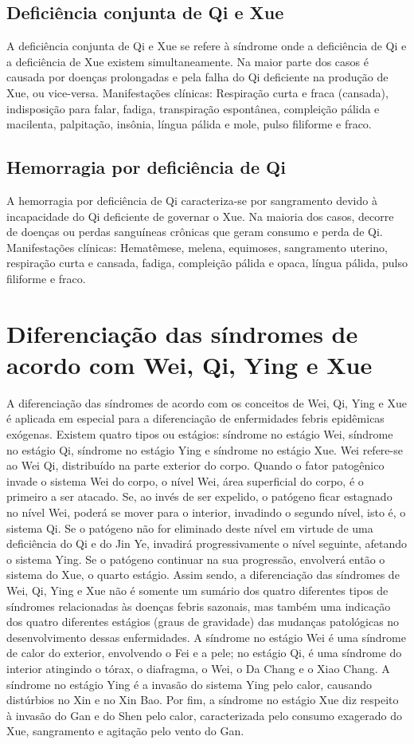 \documentclass[12pt,oneside,a4paper]{book} %
\begin{document}
\section{Deficiência conjunta de Qi e Xue}
A deficiência conjunta de Qi e Xue se refere à síndrome onde a deficiência de Qi e a deficiência de Xue existem simultaneamente. Na maior parte dos casos é causada por doenças prolongadas e pela falha do Qi deficiente na produção de Xue, ou vice-versa.
Manifestações clínicas: Respiração curta e fraca (cansada), indisposição para falar, fadiga, transpiração espontânea, compleição pálida e macilenta, palpitação, insônia, língua pálida e mole, pulso filiforme e fraco.

\section{Hemorragia por deficiência de Qi}
A hemorragia por deficiência de Qi caracteriza-se por sangramento devido à incapacidade do Qi deficiente de governar o Xue. Na maioria dos casos, decorre de doenças ou perdas sanguíneas crônicas que geram consumo e perda de Qi.
Manifestações clínicas: Hematêmese, melena, equimoses, sangramento uterino, respiração curta e cansada, fadiga, compleição pálida e opaca, língua pálida, pulso filiforme e fraco.

\chapter{Diferenciação das síndromes de acordo com Wei, Qi, Ying e Xue}

A diferenciação das síndromes de acordo com os conceitos de Wei, Qi, Ying e Xue é aplicada em especial para a diferenciação de enfermidades febris epidêmicas exógenas. Existem quatro tipos ou estágios: síndrome no estágio Wei, síndrome no estágio Qi, síndrome no estágio Ying e síndrome no estágio Xue.
Wei refere-se ao Wei Qi, distribuído na parte exterior do corpo. Quando o fator patogênico invade o sistema Wei do corpo, o nível Wei, área superficial do corpo, é o primeiro a ser atacado. Se, ao invés de ser expelido, o patógeno ficar estagnado no nível Wei, poderá se mover para o interior, invadindo o segundo nível, isto é, o sistema Qi. Se o patógeno não for eliminado deste nível em virtude de uma deficiência do Qi e do Jin Ye, invadirá progressivamente o nível seguinte, afetando o sistema Ying. Se o patógeno continuar na sua progressão, envolverá então o sistema do Xue, o quarto estágio. Assim sendo, a diferenciação das síndromes de Wei, Qi, Ying e Xue não é somente um sumário dos quatro diferentes tipos de síndromes relacionadas às doenças febris sazonais, mas também uma indicação dos quatro diferentes estágios (graus de gravidade) das mudanças patológicas no desenvolvimento dessas enfermidades.
A síndrome no estágio Wei é uma síndrome de calor do exterior, envolvendo o Fei e a pele; no estágio Qi, é uma síndrome do interior atingindo o tórax, o diafragma, o Wei, o Da Chang e o Xiao Chang. A síndrome no estágio Ying é a invasão do sistema Ying pelo calor, causando distúrbios no Xin e no Xin Bao. Por fim, a síndrome no estágio Xue diz respeito à invasão do Gan e do Shen pelo calor, caracterizada pelo consumo exagerado do Xue, sangramento e agitação pelo vento do Gan.
\end{document}
